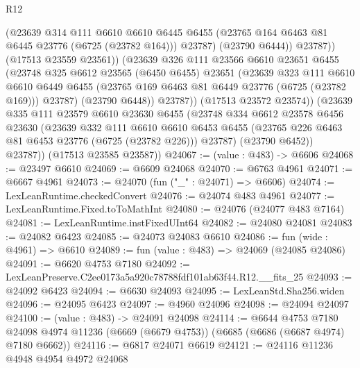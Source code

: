 \begin{lexlean}{R12}
\begin{coremodule}
                    (@23639
                      @314
                      @111
                      @6610
                      @6610
                      @6445
                      @6455
                      (@23765 @164 @6463 @81 @6445 @23776 (@6725 (@23782 @164)))
                      @23787)
                    (@23790 @6444))
                  @23787))
              (@17513 @23559 @23561))
            (@23639
              @326
              @111
              @23566
              @6610
              @23651
              @6455
              (@23748
                @325
                @6612
                @23565
                (@6450 @6455)
                @23651
                (@23639
                  @323
                  @111
                  @6610
                  @6610
                  @6449
                  @6455
                  (@23765 @169 @6463 @81 @6449 @23776 (@6725 (@23782 @169)))
                  @23787)
                (@23790 @6448))
              @23787))
          (@17513 @23572 @23574))
        (@23639
          @335
          @111
          @23579
          @6610
          @23630
          @6455
          (@23748
            @334
            @6612
            @23578
            @6456
            @23630
            (@23639
              @332
              @111
              @6610
              @6610
              @6453
              @6455
              (@23765 @226 @6463 @81 @6453 @23776 (@6725 (@23782 @226)))
              @23787)
            (@23790 @6452))
          @23787))
      (@17513 @23585 @23587))
@24067 := (value : @483) -> @6606
@24068 := @23497 @6610
@24069 := @6609 @24068
@24070 := @6763 @4961
@24071 := @6667 @4961
@24073 := @24070 (fun ("_" : @24071) => @6606)
@24074 := LexLeanRuntime.checkedConvert
@24076 := @24074 @483 @4961
@24077 := LexLeanRuntime.Fixed.toToMathInt
@24080 := @24076 (@24077 @483 @7164)
@24081 := LexLeanRuntime.instFixedUInt64
@24082 := @24080 @24081
@24083 := @24082 @6423
@24085 := @24073 @24083 @6610
@24086 := fun (wide : @4961) => @6610
@24089 := fun (value : @483) => @24069 (@24085 @24086)
@24091 := @6620 @4753 @7180
@24092 := LexLeanPreserve.C2ee0173a5a920c78788fdf101ab63f44.R12.__fits_25
@24093 := @24092 @6423
@24094 := @6630 @24093
@24095 := LexLeanStd.Sha256.widen
@24096 := @24095 @6423
@24097 := @4960 @24096
@24098 := @24094 @24097
@24100 := (value : @483) -> @24091 @24098
@24114 := @6644
    @4753
    @7180
    @24098
    @4974
    @11236
    (@6669 (@6679 @4753))
    (@6685 (@6686 (@6687 @4974) @7180 @6662))
@24116 := @6817 @24071 @6619
@24121 := @24116 @11236 @4948 @4954 @4972 @24068

\end{coremodule}
\end{lexlean}
